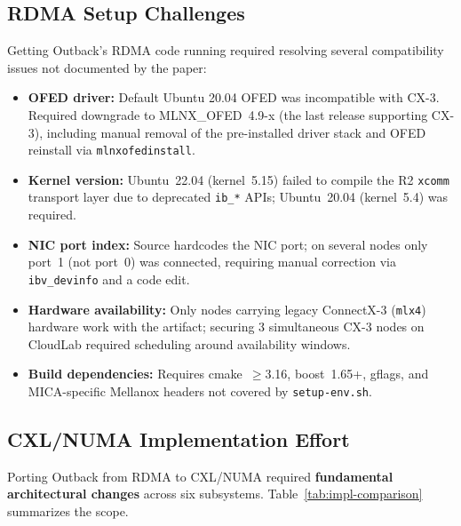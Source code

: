 \documentclass[conference]{IEEEtran}
\begin{document}
\subsection{RDMA Setup Challenges}

Getting Outback's RDMA code running required resolving several compatibility issues not documented by the paper:

\begin{itemize}[nosep]
  \item \textbf{OFED driver:} Default Ubuntu 20.04 OFED was incompatible with CX-3. Required downgrade to MLNX\_OFED~4.9-x (the last release supporting CX-3), including manual removal of the pre-installed driver stack and OFED reinstall via \texttt{mlnxofedinstall}.
  \item \textbf{Kernel version:} Ubuntu~22.04 (kernel~5.15) failed to compile the R2 \texttt{xcomm} transport layer due to deprecated \texttt{ib\_*} APIs; Ubuntu~20.04 (kernel~5.4) was required.
  \item \textbf{NIC port index:} Source hardcodes the NIC port; on several nodes only port~1 (not port~0) was connected, requiring manual correction via \texttt{ibv\_devinfo} and a code edit.
  \item \textbf{Hardware availability:} Only nodes carrying legacy ConnectX-3 (\texttt{mlx4}) hardware work with the artifact; securing 3 simultaneous CX-3 nodes on CloudLab required scheduling around availability windows.
  \item \textbf{Build dependencies:} Requires cmake~$\geq$3.16, boost~1.65+, gflags, and MICA-specific Mellanox headers not covered by \texttt{setup-env.sh}.
\end{itemize}

\subsection{CXL/NUMA Implementation Effort}

Porting Outback from RDMA to CXL/NUMA required \textbf{fundamental architectural changes} across six subsystems. Table~\ref{tab:impl-comparison} summarizes the scope.
\end{document}
